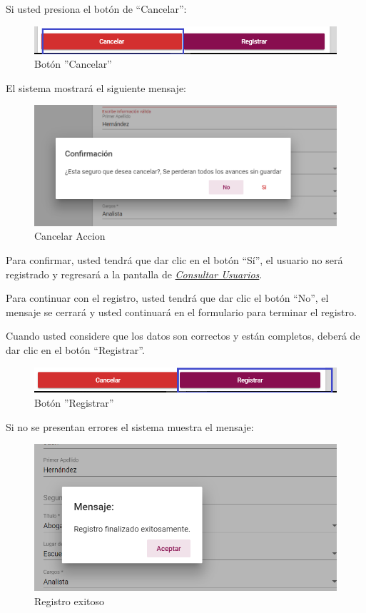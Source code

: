   \newpage
  Si usted presiona el botón de “Cancelar”:
  
  \begin{figure}[!hbtp]
  	\centering
  	\hypertarget{cancel1}{\includegraphics[width=0.7\linewidth]{images/SP5/BtnCancelar1}}
  	\caption{Botón ''Cancelar''}
  	\label{cancel1}
  \end{figure}
  
  El sistema mostrará el siguiente mensaje:
  
  
  \begin{figure}[!hbtp]
  	\centering
  	\includegraphics[width=0.4\linewidth]{images/SP5/MSG29}
  	\caption{Cancelar Accion}
  	\label{mensaje29}
  \end{figure}
  
  Para confirmar, usted tendrá que dar clic en el botón “Sí”, el usuario no será registrado y regresará a la pantalla de \hyperlink{consultarUs}{\textit{Consultar Usuarios}}.
  
  Para continuar con el registro, usted tendrá que  dar clic el botón “No”, el mensaje se  cerrará y usted continuará en el formulario para terminar el registro.
  
  Cuando usted considere que los datos son correctos y están completos, deberá de dar clic en el botón “Registrar”.
  
  \begin{figure}[!hbtp]
  	\centering
  	\hypertarget{btnreg}{\includegraphics[width=0.7\linewidth]{images/SP5/BtnRegistrar}}
  	\caption{Botón ''Registrar''}
  	\label{btnreg}
  \end{figure}
  
  Si no se presentan errores el sistema muestra el mensaje:
  
  
  \begin{figure}[!hbtp]
  	\centering
  	\includegraphics[width=0.4\linewidth]{images/SP5/MSG5}
  	\caption{Registro exitoso}
  	\label{mensaje5}
  	
  \end{figure}
  
